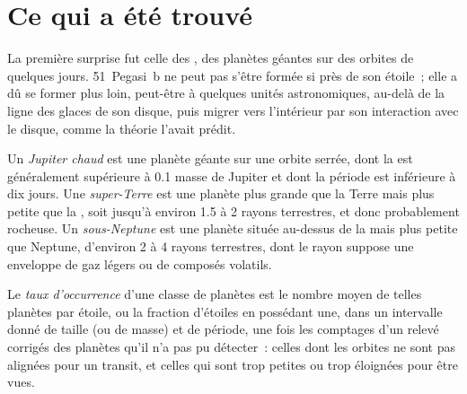 
\section{Ce qui a été trouvé}\label{sec:b3:exoplanets:found}

La première surprise fut celle des , des planètes géantes sur des orbites de
quelques jours. 51~Pegasi~b ne peut pas s'être formée si près de son étoile~; elle a dû
se former plus loin, peut-être à quelques unités astronomiques, au-delà de la ligne des
glaces de son disque, puis migrer vers l'intérieur par son interaction avec le disque,
comme la théorie l'avait prédit.

\begin{definition}\label{def:b3:exoplanets:classes}
Un \emph{Jupiter chaud} est une planète géante sur une orbite serrée,
dont la  est généralement supérieure à 0.1 masse de Jupiter et dont la période
est inférieure à dix jours. Une \emph{super-Terre} est une planète plus grande
que la Terre mais plus petite que la , soit jusqu'à environ 1.5 à 2 rayons
terrestres, et donc probablement rocheuse. Un \emph{sous-Neptune}
est une planète située au-dessus de la  mais plus petite que Neptune, d'environ 2
à 4 rayons terrestres, dont le rayon suppose une enveloppe de gaz légers ou de
composés volatils.
\end{definition}

\begin{definition}\label{def:b3:exoplanets:occurrence}
Le \emph{taux d'occurrence} d'une classe de planètes est le
nombre moyen de telles planètes par étoile, ou la fraction d'étoiles en possédant une,
dans un intervalle donné de taille (ou de masse) et de période, une fois les comptages d'un
relevé corrigés des planètes qu'il n'a pas pu détecter~: celles dont les orbites ne sont
pas alignées pour un transit, et celles qui sont trop petites ou trop éloignées pour être
vues.
\end{definition}

